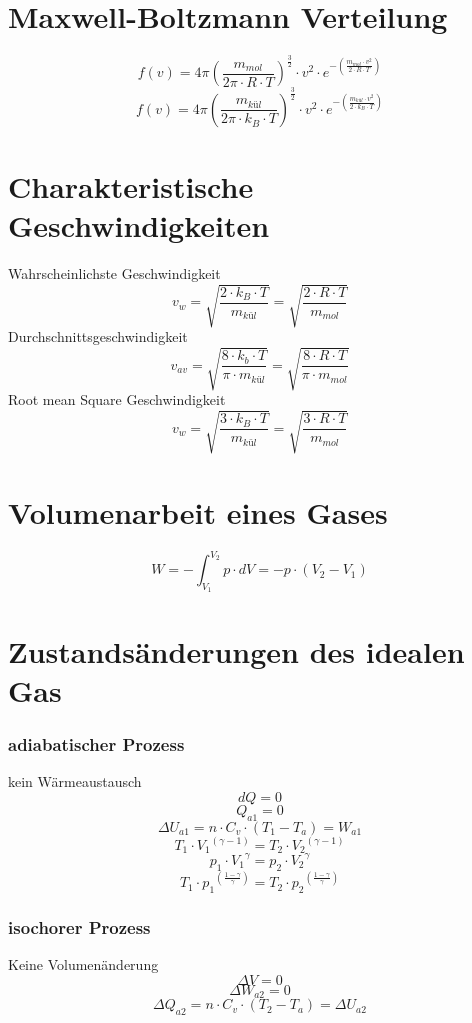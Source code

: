 \section{Maxwell-Boltzmann Verteilung}
\[ \boxed{f(v) = 4 \pi \left(\frac{m_{mol}}{2 \pi \cdot R \cdot T}\right)^{\frac{3}{2}}
\cdot v^2 \cdot e^{-\left(\frac{m_{mol} \cdot v^2}{2 \cdot R \cdot T}\right)}} \]
\[ \boxed{f(v) = 4 \pi \left(\frac{m_{kül}}{2 \pi \cdot k_B \cdot T}\right)^{\frac{3}{2}}
\cdot v^2 \cdot e^{-\left(\frac{m_{kül} \cdot v^2}{2 \cdot k_B \cdot T}\right)}} \]

\section{Charakteristische Geschwindigkeiten}
Wahrscheinlichste Geschwindigkeit
\[ \boxed{v_w = \sqrt{\frac{2 \cdot k_B \cdot T}{m_{kül}}} 
= \sqrt{\frac{2 \cdot R \cdot T}{m_{mol}}}} \]
Durchschnittsgeschwindigkeit
\[ \boxed{v_{av} = \sqrt{\frac{8 \cdot k_b \cdot T}{\pi \cdot m_{kül}}} 
= \sqrt{\frac{8 \cdot R \cdot T}{\pi \cdot m_{mol}}}} \]
Root mean Square Geschwindigkeit
\[ \boxed{v_w = \sqrt{\frac{3 \cdot k_B \cdot T}{m_{kül}}} 
= \sqrt{\frac{3 \cdot R \cdot T}{m_{mol}}}} \]

\section{Volumenarbeit eines Gases}
\[ \boxed{W = -\int_{V_1}^{V_2} p \cdot dV = - p \cdot (V_2 - V_1)} \]

\section{Zustandsänderungen des idealen Gas}

\subsubsection{adiabatischer Prozess}
kein Wärmeaustausch
\[ d Q = 0 \]
\[ Q_{a1} = 0 \]
\[ \Delta U_{a1} = n \cdot C_v \cdot (T_1 - T_a) = W_{a1} \]
\[ T_1 \cdot {V_1}^{(\gamma - 1)} = T_2 \cdot {V_2}^{(\gamma - 1)} \]
\[ p_1 \cdot {V_1}^{\gamma} = p_2 \cdot {V_2}^{\gamma} \]
\[ T_1 \cdot {p_1}^{\left(\frac{1 - \gamma}{\gamma}\right)} 
= T_2 \cdot {p_2}^{\left(\frac{1 - \gamma}{\gamma}\right)} \]

\subsubsection{isochorer Prozess}
Keine Volumenänderung
\[ \Delta V = 0 \]
\[ \Delta W_{a2} = 0 \]
\[ \Delta Q_{a2} = n \cdot C_v \cdot (T_2 - T_a) = \Delta U_{a2} \]

